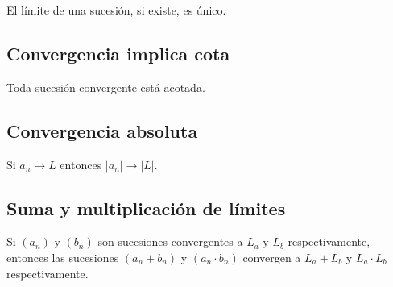\documentclass{article}
\begin{document}
El límite de una sucesión, si existe, es único.


\subsection*{Convergencia implica cota}

Toda sucesión convergente está acotada.


\subsection*{Convergencia absoluta}

Si $a_n\to L$ entonces $|a_n|\to |L|$.

\subsection*{Suma y multiplicación de límites}
Si $(a_n)$ y $(b_n)$ son sucesiones convergentes a $L_a$ y $L_b$ respectivamente, entonces las sucesiones $(a_n+b_n)$ y $(a_n\cdot b_n)$ convergen a $L_a+L_b$ y $L_a\cdot L_b$ respectivamente.
\end{document}
